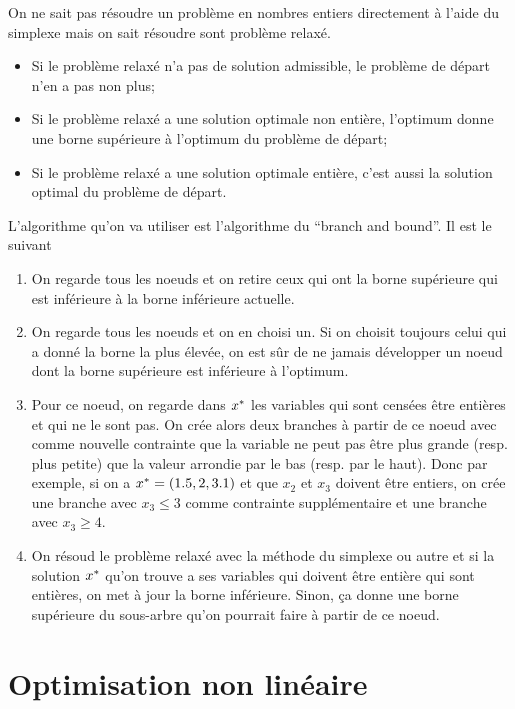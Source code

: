 On ne sait pas résoudre un problème en nombres entiers directement à l'aide
du simplexe mais on sait résoudre sont problème relaxé.
\begin{itemize}
  \item Si le problème relaxé n'a pas de solution admissible,
    le problème de départ n'en a pas non plus;
  \item Si le problème relaxé a une solution optimale non entière,
    l'optimum donne une borne supérieure à l'optimum du problème de départ;
  \item Si le problème relaxé a une solution optimale entière,
    c'est aussi la solution optimal du problème de départ.
\end{itemize}

L'algorithme qu'on va utiliser est l'algorithme du ``branch and bound''.
Il est le suivant
\begin{enumerate}
  \item On regarde tous les noeuds et on retire ceux qui ont la borne
    supérieure qui est inférieure à la borne inférieure actuelle.
  \item On regarde tous les noeuds et on en choisi un.
    Si on choisit toujours celui qui a donné la borne la plus élevée,
    on est sûr de ne jamais développer un noeud dont la borne supérieure est
    inférieure à l'optimum.
  \item Pour ce noeud, on regarde dans $x^*$ les variables qui sont censées
    être entières et qui ne le sont pas.
    On crée alors deux branches à partir de ce noeud avec comme nouvelle
    contrainte que la variable ne peut pas être plus grande
    (resp. plus petite) que la valeur arrondie par le bas (resp. par le haut).
    Donc par exemple, si on a $x^* = (1.5, 2, 3.1)$ et que $x_2$ et $x_3$
    doivent être entiers, on crée une branche avec $x_3 \leq 3$ comme
    contrainte supplémentaire et une branche avec $x_3 \geq 4$.
  \item On résoud le problème relaxé avec la méthode du simplexe ou autre
    et si la solution $x^*$ qu'on trouve a ses variables qui doivent être
    entière qui sont entières, on met à jour la borne inférieure.
    Sinon, ça donne une borne supérieure du sous-arbre qu'on pourrait
    faire à partir de ce noeud.
\end{enumerate}

\part{Optimisation non linéaire}

